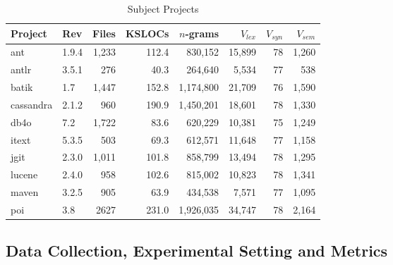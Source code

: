 \begin{table}[t]
  \centering
  \scriptsize
  \renewcommand{\arraystretch}{0.9}
  \caption{Subject Projects}
    \begin{tabular}{l|l|r|r|r|r|r|r}
    \hline
    Project & Rev & Files & KSLOCs & $n$-grams & $V_{lex}$   & $V_{syn}$  & $V_{sem}$ \\
    \hline
    ant   & 1.9.4 & 1,233 & 112.4 &        830,152  &    15,899  & 78    &      1,260  \\
    antlr & 3.5.1 & 276   & 40.3  &        264,640  &      5,534  & 77    &         538  \\
    batik & 1.7   & 1,447 & 152.8 &    1,174,800  &    21,709  & 76    &      1,590  \\
    cassandra & 2.1.2 & 960   & 190.9 &    1,450,201  &    18,601  & 78    &      1,330  \\
    db4o  & 7.2   & 1,722 & 83.6  &        620,229  &    10,381  & 75    &      1,249  \\
    itext & 5.3.5 & 503   & 69.3  &        612,571  &    11,648  & 77    &      1,158  \\
    jgit  & 2.3.0 & 1,011 & 101.8 &        858,799  &    13,494  & 78    &      1,295  \\
    lucene & 2.4.0 & 958   & 102.6 &        815,002  &    10,823  & 78    &      1,341  \\
    maven & 3.2.5 & 905   & 63.9  &        434,538  &      7,571  & 77    &      1,095  \\
    poi   & 3.8   & 2627  & 231.0 &    1,926,035  &    34,747  & 78    &      2,164  \\

    \hline
    \end{tabular}%
  \label{systemtab}%
\end{table}%




%

\subsection{Data Collection, Experimental Setting and Metrics}



